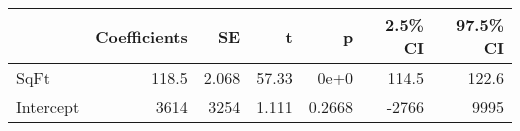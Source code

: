 \begin{tabular}{lrrrrrr}
\toprule
{} &  Coefficients &    SE &     t &      p &  2.5\% CI &  97.5\% CI \\
\midrule
SqFt      &         118.5 & 2.068 & 57.33 &   0e+0 &    114.5 &     122.6 \\
Intercept &          3614 &  3254 & 1.111 & 0.2668 &    -2766 &      9995 \\
\bottomrule
\end{tabular}
